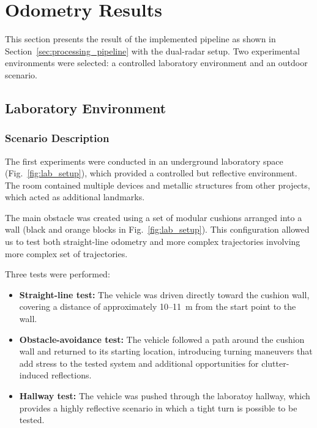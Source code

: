 \section{Odometry Results}
\label{sec:odometry_results}

This section presents the result of the implemented pipeline as shown in Section~\ref{sec:processing_pipeline} with the dual-radar setup.
Two experimental environments were selected: a controlled laboratory environment and an outdoor scenario. 

\subsection{Laboratory Environment}
\subsubsection{Scenario Description}

The first experiments were conducted in an underground laboratory space (Fig.~\ref{fig:lab_setup}), which provided a controlled but reflective environment.  
The room contained multiple devices and metallic structures from other projects, which acted as additional landmarks.  

The main obstacle was created using a set of modular cushions arranged into a wall (black and orange blocks in Fig.~\ref{fig:lab_setup}).  
This configuration allowed us to test both straight-line odometry and more complex trajectories involving more complex set of trajectories.  

Three tests were performed:
\begin{itemize}
    \item \textbf{Straight-line test:} The vehicle was driven directly toward the cushion wall, covering a distance of approximately 10--11~m from the start point to the wall.  
    \item \textbf{Obstacle-avoidance test:} The vehicle followed a path around the cushion wall and returned to its starting location, introducing turning maneuvers that add stress to the tested system and additional opportunities for clutter-induced reflections. 
    \item \textbf{Hallway test:} The vehicle was pushed through the laboratoy hallway, which provides a highly reflective scenario in which a tight turn is possible to be tested.
\end{itemize}


